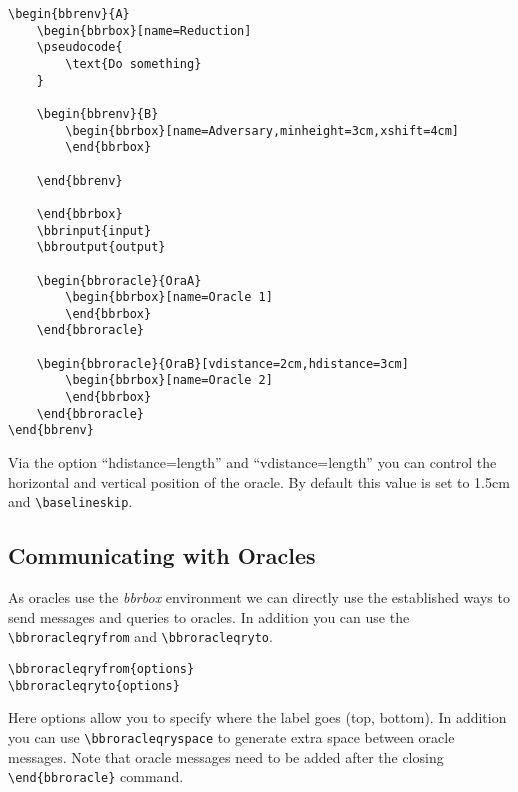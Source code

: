\documentclass[a4paper]{report}
\begin{document}
\begin{lstlisting}
\begin{bbrenv}{A}
	\begin{bbrbox}[name=Reduction]
	\pseudocode{
		\text{Do something} 
	}

	\begin{bbrenv}{B}
		\begin{bbrbox}[name=Adversary,minheight=3cm,xshift=4cm]
		\end{bbrbox}

	\end{bbrenv}

	\end{bbrbox}
	\bbrinput{input}
	\bbroutput{output}

	\begin{bbroracle}{OraA}
		\begin{bbrbox}[name=Oracle 1]
		\end{bbrbox}
	\end{bbroracle}

	\begin{bbroracle}{OraB}[vdistance=2cm,hdistance=3cm]
		\begin{bbrbox}[name=Oracle 2]
		\end{bbrbox}
	\end{bbroracle}
\end{bbrenv}
\end{lstlisting}
Via the option \enquote{hdistance=length} and \enquote{vdistance=length} you can control the horizontal and vertical position of the oracle. By default this value is set to 1.5cm and \lstinline$\baselineskip$.


\subsection{Communicating with Oracles}
As oracles use the \emph{bbrbox} environment we can directly use the established ways to send messages and
queries to oracles. In addition you can use the \lstinline$\bbroracleqryfrom$ and \lstinline$\bbroracleqryto$.
\begin{lstlisting}
\bbroracleqryfrom{options}
\bbroracleqryto{options}
\end{lstlisting}
Here options allow you to specify where the label goes (top, bottom). In addition you can use
\lstinline$\bbroracleqryspace$ to generate extra space between oracle messages. Note
that oracle messages need to be added after the closing \lstinline$\end{bbroracle}$ command.
\end{document}
